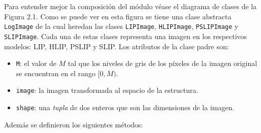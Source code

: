 Para entender mejor la composici\'on del m\'odulo v\'ease el diagrama de clases de la Figura 2.1. Como se puede ver en esta figura se tiene una clase abstracta \verb|LogImage| de la cual heredan las clases \verb|LIPImage|, \verb|HLIPImage|, \verb|PSLIPImage| y \verb|SLIPImage|. Cada una de estas clases representa una imagen en los respectivos modelos: LIP, HLIP, PSLIP y SLIP. Los atributos de la clase padre son:

\begin{itemize}
	\item \verb|M|: el valor de $M$ tal que los niveles de gris de los p\'ixeles de la imagen original se encuentran en el rango $[0,M)$.
	\item \verb|image|: la imagen transformada al espacio de la estructura.
	\item \verb|shape|: una \textit{tupla} de dos enteros que son las dimensiones de la imagen.
\end{itemize}

Adem\'as se definieron los siguientes m\'etodos:


